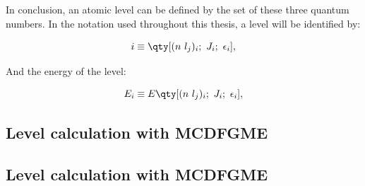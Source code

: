 In conclusion, an atomic level can be defined by the set of these three quantum numbers. In the notation used throughout this thesis, a level will be identified by:

\begin{equation}
    i\equiv \qty[(n\ l_j)_i;\ J_i;\ \epsilon_i],
    \label{eq:level_notation}
\end{equation}

And the energy of the level:

\begin{equation}
    E_i\equiv E \qty[(n\ l_j)_i;\ J_i;\ \epsilon_i],
\end{equation}



\subsection{Level calculation with \gls{MCDFGME}}






\subsection{Level calculation with \gls{MCDFGME}}

